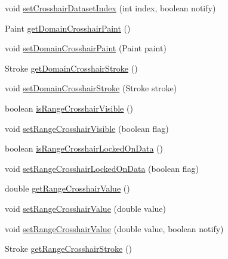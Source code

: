 \begin{DoxyCompactItemize}
\item 
void \mbox{\hyperlink{classorg_1_1jfree_1_1chart_1_1plot_1_1_category_plot_a4b9a59d0986c2273c61cc71449c1a1b1}{set\+Crosshair\+Dataset\+Index}} (int index, boolean notify)
\item 
Paint \mbox{\hyperlink{classorg_1_1jfree_1_1chart_1_1plot_1_1_category_plot_af251f4c3084a499f54915e07d09ba19c}{get\+Domain\+Crosshair\+Paint}} ()
\item 
void \mbox{\hyperlink{classorg_1_1jfree_1_1chart_1_1plot_1_1_category_plot_a96d14ca4936954bccd9059823375c079}{set\+Domain\+Crosshair\+Paint}} (Paint paint)
\item 
Stroke \mbox{\hyperlink{classorg_1_1jfree_1_1chart_1_1plot_1_1_category_plot_a87294a333f0a33da9ea7785774a7920f}{get\+Domain\+Crosshair\+Stroke}} ()
\item 
void \mbox{\hyperlink{classorg_1_1jfree_1_1chart_1_1plot_1_1_category_plot_af1fe2517f279b99a87890ee816451801}{set\+Domain\+Crosshair\+Stroke}} (Stroke stroke)
\item 
boolean \mbox{\hyperlink{classorg_1_1jfree_1_1chart_1_1plot_1_1_category_plot_ab7277c96161f03a087953b3313b39c47}{is\+Range\+Crosshair\+Visible}} ()
\item 
void \mbox{\hyperlink{classorg_1_1jfree_1_1chart_1_1plot_1_1_category_plot_a885d7f1c76a50bbd6c131e014fe917a5}{set\+Range\+Crosshair\+Visible}} (boolean flag)
\item 
boolean \mbox{\hyperlink{classorg_1_1jfree_1_1chart_1_1plot_1_1_category_plot_ad14fc326734b3094e9b0f6fb5e93e0bf}{is\+Range\+Crosshair\+Locked\+On\+Data}} ()
\item 
void \mbox{\hyperlink{classorg_1_1jfree_1_1chart_1_1plot_1_1_category_plot_a95ddd96d6edb4b47d0157de79aa890aa}{set\+Range\+Crosshair\+Locked\+On\+Data}} (boolean flag)
\item 
double \mbox{\hyperlink{classorg_1_1jfree_1_1chart_1_1plot_1_1_category_plot_a01074b7b04854fda802e06bb5418671b}{get\+Range\+Crosshair\+Value}} ()
\item 
void \mbox{\hyperlink{classorg_1_1jfree_1_1chart_1_1plot_1_1_category_plot_af4795fd7065e9245eb43140f5adf7fed}{set\+Range\+Crosshair\+Value}} (double value)
\item 
void \mbox{\hyperlink{classorg_1_1jfree_1_1chart_1_1plot_1_1_category_plot_a15a4903dc9c5f79a02fb1e41ca30409e}{set\+Range\+Crosshair\+Value}} (double value, boolean notify)
\item 
Stroke \mbox{\hyperlink{classorg_1_1jfree_1_1chart_1_1plot_1_1_category_plot_ace9c05d0aebbe5a5a97b1c0572c3ac83}{get\+Range\+Crosshair\+Stroke}} ()

\end{DoxyCompactItemize}
